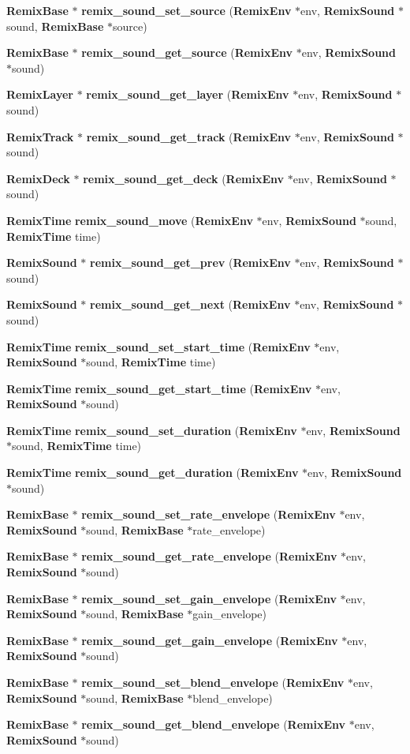 \begin{DoxyCompactItemize}
\item 
{\bf RemixBase} $\ast$ {\bf remix\_\-sound\_\-set\_\-source} ({\bf RemixEnv} $\ast$env, {\bf RemixSound} $\ast$sound, {\bf RemixBase} $\ast$source)
\item 
{\bf RemixBase} $\ast$ {\bf remix\_\-sound\_\-get\_\-source} ({\bf RemixEnv} $\ast$env, {\bf RemixSound} $\ast$sound)
\item 
{\bf RemixLayer} $\ast$ {\bf remix\_\-sound\_\-get\_\-layer} ({\bf RemixEnv} $\ast$env, {\bf RemixSound} $\ast$sound)
\item 
{\bf RemixTrack} $\ast$ {\bf remix\_\-sound\_\-get\_\-track} ({\bf RemixEnv} $\ast$env, {\bf RemixSound} $\ast$sound)
\item 
{\bf RemixDeck} $\ast$ {\bf remix\_\-sound\_\-get\_\-deck} ({\bf RemixEnv} $\ast$env, {\bf RemixSound} $\ast$sound)
\item 
{\bf RemixTime} {\bf remix\_\-sound\_\-move} ({\bf RemixEnv} $\ast$env, {\bf RemixSound} $\ast$sound, {\bf RemixTime} time)
\item 
{\bf RemixSound} $\ast$ {\bf remix\_\-sound\_\-get\_\-prev} ({\bf RemixEnv} $\ast$env, {\bf RemixSound} $\ast$sound)
\item 
{\bf RemixSound} $\ast$ {\bf remix\_\-sound\_\-get\_\-next} ({\bf RemixEnv} $\ast$env, {\bf RemixSound} $\ast$sound)
\item 
{\bf RemixTime} {\bf remix\_\-sound\_\-set\_\-start\_\-time} ({\bf RemixEnv} $\ast$env, {\bf RemixSound} $\ast$sound, {\bf RemixTime} time)
\item 
{\bf RemixTime} {\bf remix\_\-sound\_\-get\_\-start\_\-time} ({\bf RemixEnv} $\ast$env, {\bf RemixSound} $\ast$sound)
\item 
{\bf RemixTime} {\bf remix\_\-sound\_\-set\_\-duration} ({\bf RemixEnv} $\ast$env, {\bf RemixSound} $\ast$sound, {\bf RemixTime} time)
\item 
{\bf RemixTime} {\bf remix\_\-sound\_\-get\_\-duration} ({\bf RemixEnv} $\ast$env, {\bf RemixSound} $\ast$sound)
\item 
{\bf RemixBase} $\ast$ {\bf remix\_\-sound\_\-set\_\-rate\_\-envelope} ({\bf RemixEnv} $\ast$env, {\bf RemixSound} $\ast$sound, {\bf RemixBase} $\ast$rate\_\-envelope)
\item 
{\bf RemixBase} $\ast$ {\bf remix\_\-sound\_\-get\_\-rate\_\-envelope} ({\bf RemixEnv} $\ast$env, {\bf RemixSound} $\ast$sound)
\item 
{\bf RemixBase} $\ast$ {\bf remix\_\-sound\_\-set\_\-gain\_\-envelope} ({\bf RemixEnv} $\ast$env, {\bf RemixSound} $\ast$sound, {\bf RemixBase} $\ast$gain\_\-envelope)
\item 
{\bf RemixBase} $\ast$ {\bf remix\_\-sound\_\-get\_\-gain\_\-envelope} ({\bf RemixEnv} $\ast$env, {\bf RemixSound} $\ast$sound)
\item 
{\bf RemixBase} $\ast$ {\bf remix\_\-sound\_\-set\_\-blend\_\-envelope} ({\bf RemixEnv} $\ast$env, {\bf RemixSound} $\ast$sound, {\bf RemixBase} $\ast$blend\_\-envelope)
\item 
{\bf RemixBase} $\ast$ {\bf remix\_\-sound\_\-get\_\-blend\_\-envelope} ({\bf RemixEnv} $\ast$env, {\bf RemixSound} $\ast$sound)
\end{DoxyCompactItemize}


